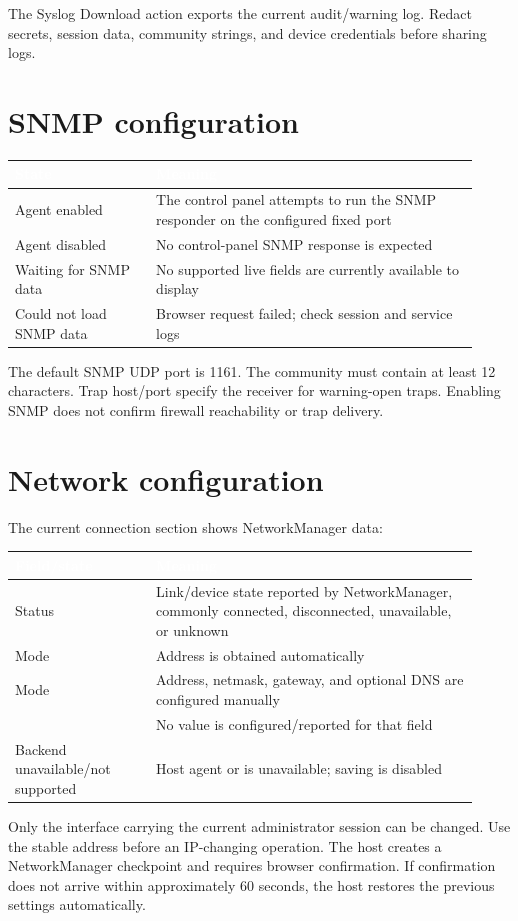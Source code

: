 \documentclass[11pt,a4paper,oneside]{book}
\newcommand{\thead}[1]{\cellcolor{panelblue}\textcolor{white}{\textbf{#1}}}
\DeclareRobustCommand{\code}[1]{\texttt{\detokenize{#1}}}
\begin{document}
The Syslog Download action exports the current audit/warning log. Redact secrets, session data, community strings, and device credentials before sharing logs.

\section{SNMP configuration}
\begin{longtable}{|>{\centering\arraybackslash}m{0.28\linewidth}|>{\centering\arraybackslash}m{0.64\linewidth}|}
\hline
\thead{State} & \thead{Meaning} \\
\hline
\endhead
Agent enabled & The control panel attempts to run the SNMP responder on the configured fixed port \\
\hline
Agent disabled & No control-panel SNMP response is expected \\
\hline
Waiting for SNMP data & No supported live fields are currently available to display \\
\hline
Could not load SNMP data & Browser request failed; check session and service logs \\
\hline
\end{longtable}
The default SNMP UDP port is 1161. The community must contain at least 12 characters. Trap host/port specify the receiver for warning-open traps. Enabling SNMP does not confirm firewall reachability or trap delivery.

\section{Network configuration}
The current connection section shows NetworkManager data:

\begin{longtable}{|>{\centering\arraybackslash}m{0.28\linewidth}|>{\centering\arraybackslash}m{0.64\linewidth}|}
\hline
\thead{Field/state} & \thead{Meaning} \\
\hline
\endhead
Status & Link/device state reported by NetworkManager, commonly connected, disconnected, unavailable, or unknown \\
\hline
Mode \code{dhcp} & Address is obtained automatically \\
\hline
Mode \code{static} & Address, netmask, gateway, and optional DNS are configured manually \\
\hline
\code{None} & No value is configured/reported for that field \\
\hline
Backend unavailable/not supported & Host agent or \code{nmcli} is unavailable; saving is disabled \\
\hline
\end{longtable}
Only the interface carrying the current administrator session can be changed. Use the stable \code{.local} address before an IP-changing operation. The host creates a NetworkManager checkpoint and requires browser confirmation. If confirmation does not arrive within approximately 60 seconds, the host restores the previous settings automatically.
\end{document}

